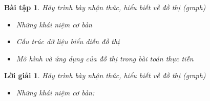 \documentclass[14pt, a4paper]{article}
\theoremstyle{sltheorem}
\newtheorem{baitap}{Bài tập}
\theoremstyle{soltheorem}
\newtheorem*{loigiai}{Lời giải}
\begin{document}
\begin{titlepage}






        \vfill %

    \end{titlepage}

    \nocite{*}

    \newpage

    \begin{baitap}
        Hãy trình bày nhận thức, hiểu biết về đồ thị (graph)
        \begin{itemize}
            \item Những khái niệm cơ bản
            \item Cấu trúc dữ liệu biểu diễn đồ thị
            \item Mô hình và ứng dụng của đồ thị trong bài toán thực tiễn
        \end{itemize}
    \end{baitap}

    \begin{loigiai}

        Hãy trình bày nhận thức, hiểu biết về đồ thị (graph)

        \begin{itemize}
            \item Những khái niệm cơ bản:
        \end{itemize}
    \end{loigiai}
\end{document}
